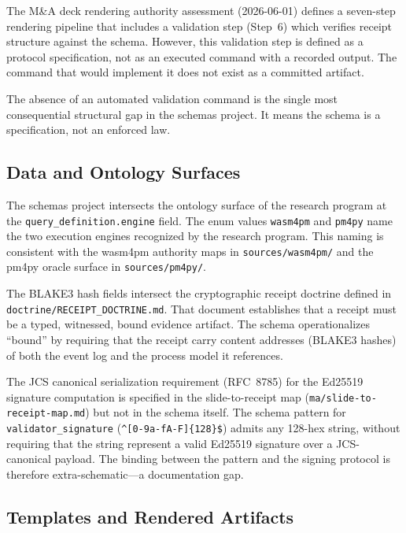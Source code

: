 The M\&A deck rendering authority assessment (2026-06-01) defines a seven-step rendering pipeline
that includes a validation step (Step~6) which verifies receipt structure against the schema.
However, this validation step is defined as a protocol specification, not as an executed command
with a recorded output. The command that would implement it does not exist as a committed artifact.

\AUTHORINTERPRETATION{} The absence of an automated validation command is the single most
consequential structural gap in the schemas project. It means the schema is a specification, not
an enforced law.

\subsection{Data and Ontology Surfaces}
\label{sec:schemas-implementation-data}

The schemas project intersects the ontology surface of the research program at the
\texttt{query\_definition.engine} field. The enum values \texttt{wasm4pm} and \texttt{pm4py}
name the two execution engines recognized by the research program. This naming is consistent with
the wasm4pm authority maps in \texttt{sources/wasm4pm/} and the pm4py oracle surface in
\texttt{sources/pm4py/}.

The BLAKE3 hash fields intersect the cryptographic receipt doctrine defined in
\texttt{doctrine/RECEIPT\_DOCTRINE.md}. That document establishes that a receipt must be a
typed, witnessed, bound evidence artifact. The schema operationalizes ``bound'' by requiring
that the receipt carry content addresses (BLAKE3 hashes) of both the event log and the process
model it references.

The JCS canonical serialization requirement (RFC~8785) for the Ed25519 signature computation is
specified in the slide-to-receipt map (\texttt{ma/slide-to-receipt-map.md}) but not in the schema
itself. The schema pattern for \texttt{validator\_signature} (\verb|^[0-9a-fA-F]{128}$|) admits
any 128-hex string, without requiring that the string represent a valid Ed25519 signature over
a JCS-canonical payload. The binding between the pattern and the signing protocol is therefore
extra-schematic---a documentation gap.

\subsection{Templates and Rendered Artifacts}
\label{sec:schemas-implementation-templates}

